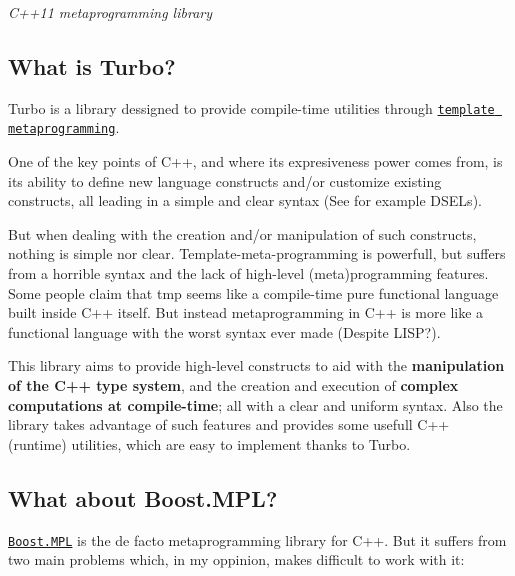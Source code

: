 {\itshape C++11 metaprogramming library}

\subsection*{What is Turbo?}

Turbo is a library dessigned to provide compile-\/time utilities through \href{http://en.wikipedia.org/wiki/Template_metaprogramming}{\tt template metaprogramming}.

One of the key points of C++, and where its expresiveness power comes from, is its ability to define new language constructs and/or customize existing constructs, all leading in a simple and clear syntax (See for example D\+S\+E\+Ls).

But when dealing with the creation and/or manipulation of such constructs, nothing is simple nor clear. Template-\/meta-\/programming is powerfull, but suffers from a horrible syntax and the lack of high-\/level (meta)programming features. Some people claim that tmp seems like a compile-\/time pure functional language built inside C++ itself. But instead metaprogramming in C++ is more like a functional language with the worst syntax ever made (Despite L\+I\+S\+P?).

This library aims to provide high-\/level constructs to aid with the {\bfseries manipulation of the C++ type system}, and the creation and execution of {\bfseries complex computations at compile-\/time}; all with a clear and uniform syntax. Also the library takes advantage of such features and provides some usefull C++ (runtime) utilities, which are easy to implement thanks to Turbo.

\subsection*{What about Boost.\+M\+P\+L?}

\href{http://www.boost.org/doc/libs/1_55_0/libs/mpl/doc/index.html}{\tt Boost.\+M\+P\+L} is the de facto metaprogramming library for C++. But it suffers from two main problems which, in my oppinion, makes difficult to work with it\+:


